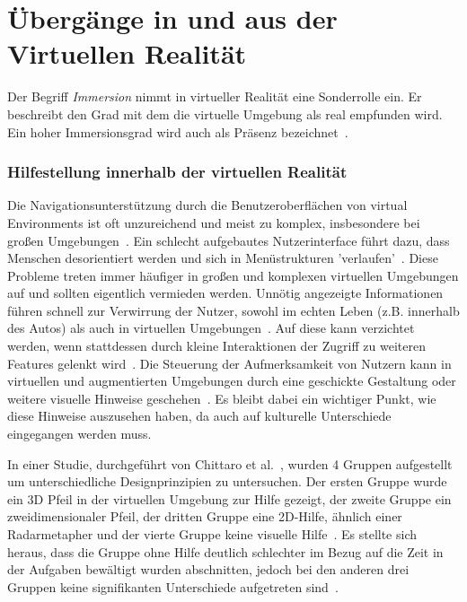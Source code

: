 \section{Übergänge in und aus der Virtuellen Realität}\label{sec:relatedWork.vr}

Der Begriff \textit{Immersion} nimmt in virtueller Realität eine Sonderrolle ein. Er beschreibt den Grad mit dem die virtuelle Umgebung als real empfunden wird. Ein hoher Immersionsgrad wird auch als Präsenz bezeichnet~\cite{bowman2007virtual,knibbe2018dream}.


\subsubsection{Hilfestellung innerhalb der virtuellen Realität}

Die Navigationsunterstützung durch die Benutzeroberflächen von virtual Environments ist oft unzureichend und meist zu komplex, insbesondere bei großen Umgebungen~\cite{chittaro20043d}. 
Ein schlecht aufgebautes Nutzerinterface führt dazu, dass Menschen desorientiert werden und sich in Menüstrukturen 'verlaufen'~\cite{chittaro20043d,bonanni2005attention}. 
Diese Probleme treten immer häufiger in großen und komplexen virtuellen Umgebungen auf und sollten eigentlich vermieden werden. 
Unnötig angezeigte Informationen führen schnell zur Verwirrung der Nutzer, sowohl im echten Leben (z.B. innerhalb des Autos) als auch in virtuellen Umgebungen~\cite{chittaro20043d}. 
Auf diese kann verzichtet werden, wenn stattdessen durch kleine Interaktionen der Zugriff zu weiteren Features gelenkt wird~\cite{chittaro20043d}. Die Steuerung der Aufmerksamkeit von Nutzern kann in virtuellen und augmentierten Umgebungen durch eine geschickte Gestaltung oder weitere visuelle Hinweise geschehen~\cite{bonanni2005attention}. Es bleibt dabei ein wichtiger Punkt, wie diese Hinweise auszusehen haben, da auch auf kulturelle Unterschiede eingegangen werden muss. 

In einer Studie, durchgeführt von Chittaro et al.~\cite{chittaro20043d}, wurden 4 Gruppen aufgestellt um unterschiedliche Designprinzipien zu untersuchen. 
Der ersten Gruppe wurde ein 3D Pfeil in der virtuellen Umgebung zur Hilfe gezeigt, der zweite Gruppe ein zweidimensionaler Pfeil, der dritten Gruppe eine 2D-Hilfe, ähnlich einer Radarmetapher und der vierte Gruppe keine visuelle Hilfe~\cite{chittaro20043d}. 
Es stellte sich heraus, dass die Gruppe ohne Hilfe deutlich schlechter im Bezug auf die Zeit in der Aufgaben bewältigt wurden abschnitten, jedoch bei den anderen drei Gruppen keine signifikanten Unterschiede aufgetreten sind~\cite{chittaro20043d}.

